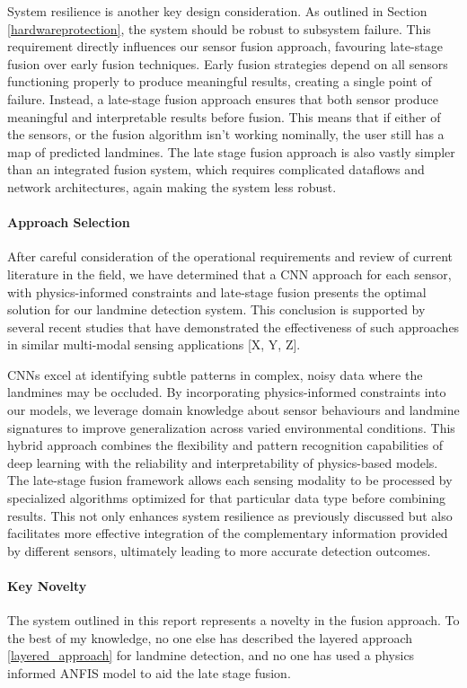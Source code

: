 System resilience is another key design consideration. As outlined in Section \ref{hardwareprotection}, the system should be robust to subsystem failure. This requirement directly influences our sensor fusion approach, favouring late-stage fusion over early fusion techniques. Early fusion strategies depend on all sensors functioning properly to produce meaningful results, creating a single point of failure. Instead, a late-stage fusion approach ensures that both sensor produce meaningful and interpretable results before fusion. This means that if either of the sensors, or the fusion algorithm isn't working nominally, the user still has a map of predicted landmines. The late stage fusion approach is also vastly simpler than an integrated fusion system, which requires complicated dataflows and network architectures, again making the system less robust.

\cite{barnawi2022review}

\paragraph{Approach Selection}
After careful consideration of the operational requirements and review of current literature in the field, we have determined that a CNN approach for each sensor, with physics-informed constraints and late-stage fusion presents the optimal solution for our landmine detection system. This conclusion is supported by several recent studies that have demonstrated the effectiveness of such approaches in similar multi-modal sensing applications [X, Y, Z].

CNNs excel at identifying subtle patterns in complex, noisy data where the landmines may be occluded. By incorporating physics-informed constraints into our models, we leverage domain knowledge about sensor behaviours and landmine signatures to improve generalization across varied environmental conditions. This hybrid approach combines the flexibility and pattern recognition capabilities of deep learning with the reliability and interpretability of physics-based models.
The late-stage fusion framework allows each sensing modality to be processed by specialized algorithms optimized for that particular data type before combining results. This not only enhances system resilience as previously discussed but also facilitates more effective integration of the complementary information provided by different sensors, ultimately leading to more accurate detection outcomes.

\paragraph{Key Novelty}

The system outlined in this report represents a novelty in the fusion approach. To the best of my knowledge, no one else has described the layered approach \ref{layered_approach} for landmine detection, and no one has used a physics informed ANFIS model to aid the late stage fusion.


